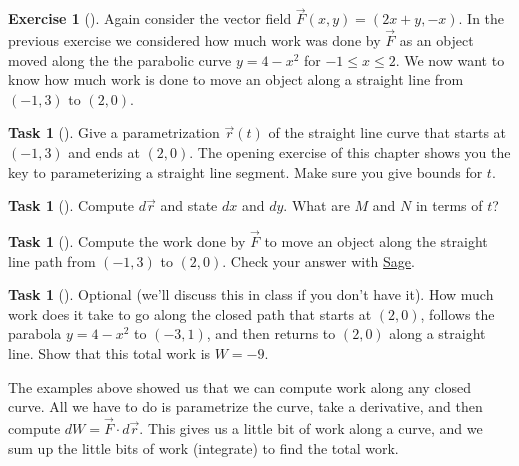 \documentclass[10pt,]{book}
\theoremstyle{plain}
\theoremstyle{definition}
\theoremstyle{definition}
\theoremstyle{definition}
\theoremstyle{definition}
\newtheorem{exploration}[project]{Exercise}
\newtheorem{task}[project]{Task}
\theoremstyle{definition}
\numberwithin{equation}{section}
\newcommand{\sageworkurl}{http://bmw.byuimath.com/dokuwiki/doku.php?id=work_calculator}
\begin{document}
\begin{exploration}[]\label{exploration-193}
Again consider the vector field \(\vec F(x,y) = (2x+y,-x)\). In the previous exercise we considered how much work was done by \(\vec F\) as an object moved along the the parabolic curve \(y=4-x^2\) for \(-1\leq x\leq 2\). We now want to know how much work is done to move an object along a straight line from \((-1,3)\) to \((2,0)\).%
\begin{task}[]\label{task-480}
Give a parametrization \(\vec r(t)\) of the straight line curve that starts at \((-1,3)\) and ends at \((2,0)\). The opening exercise of this chapter shows you the key to parameterizing a straight line segment.  Make sure you give bounds for \(t\).%
\end{task}
\begin{task}[]\label{task-481}
Compute \(d\vec r\) and state \(dx\) and \(dy\). What are \(M\) and \(N\) in terms of \(t\)?%
\end{task}
\begin{task}[]\label{task-482}
Compute the work done by \(\vec F\) to move an object along the straight line path from \((-1,3)\) to \((2,0)\). Check your answer with \href{\\sageworkurl}{Sage}.  %
\end{task}
\begin{task}[]\label{task-483}
Optional (we'll discuss this in class if you don't have it).  How much work does it take to go along the closed path that starts at \((2,0)\), follows the parabola \(y=4-x^2\) to \((-3,1)\), and then returns to \((2,0)\) along a straight line. Show that this total work is \(W=-9\).%
\end{task}
\end{exploration}
The examples above showed us that we can compute work along any closed curve. All we have to do is parametrize the curve, take a derivative, and then compute \(dW = \vec F \cdot d\vec r\). This gives us a little bit of work along a curve, and we sum up the little bits of work (integrate) to find the total work.%
\typeout{************************************************}
\typeout{************************************************}
\end{document}
